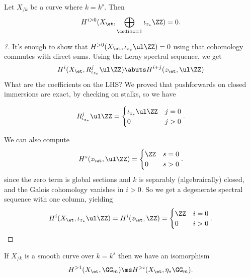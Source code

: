 \begin{proposition}[?]

Let \(X_{/k}\) be a curve where \(k=k^{s}\). Then
\begin{align*}  
H^{i>0}(X_\et, \bigoplus_{\codim z = 1} \iota_{z_*} \ZZ) = 0
.\end{align*}

\end{proposition}

\begin{proof}[?]

It's enough to show that \(H^{>0}(X_\et, \iota_{z_*} \ul \ZZ) = 0\)
using that cohomology commutes with direct sums. Using the Leray
spectral sequence, we get
\begin{align*}
H^i(X_\et, R^j_{\iota_{z_*}} \ul \ZZ)\abuts H^{i+j}(z_\et, \ul \ZZ)
\end{align*} What are the coefficients on the LHS? We proved that
pushforwards on closed immersions are exact, by checking on stalks, so
we have

\begin{align*}  
R^j _{\iota_{z_*}} \ul \ZZ
=
\begin{cases}
\iota_{z_*} \ul \ZZ & j = 0 \\
0 & j > 0
\end{cases}
.\end{align*}

We can also compute
\begin{align*}  
H^s(z_\et, \ul \ZZ)
=
\begin{cases}
\ZZ & s = 0 \\
0 & s>0
\end{cases}
.\end{align*} since the zero term is global sections and \(k\) is
separably (algebraically) closed, and the Galois cohomology vanishes in
\(i>0\). So we get a degenerate spectral sequence with one column,
yielding
\begin{align*}  
H^i (X_\et, \iota_{z_*} \ul \ZZ) 
=
H^i(z_{\et}, \ZZ)
=
\begin{cases}
\ZZ & i = 0 \\
0 & i> 0
\end{cases}
.\end{align*}

\end{proof}

\begin{corollary}[?]

If \(X_{/k}\) is a smooth curve over \(k=k^{s}\) then we have an
isomorphism
\begin{align*}  
H^{>1}(X_\et, \GG_m) \ms H^{>i}(X_\et, \eta_* \GG_m)
.\end{align*}

\end{corollary}

